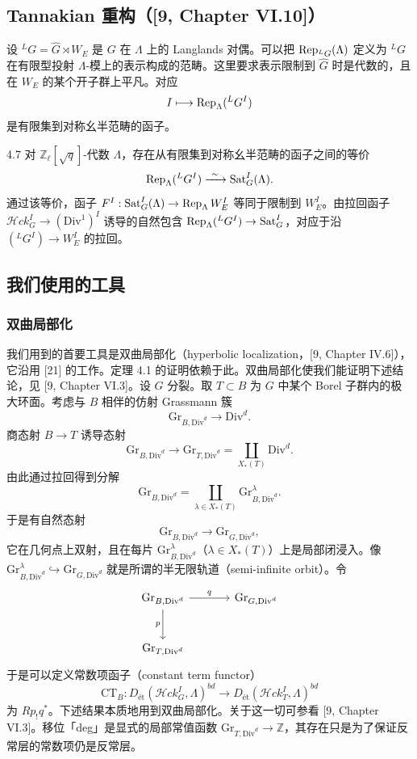 \subsection{Tannakian 重构（[9, Chapter VI.10]）}
设 ${}^{L}G=\widehat{G}\rtimes W_{E}$ 是 $G$ 在 $\Lambda$ 上的 Langlands 对偶。可以把 $\operatorname{Rep}_{{}^{L}G}(\Lambda)$ 定义为 ${}^{L}G$ 在有限型投射 $\Lambda$-模上的表示构成的范畴。这里要求表示限制到 $\widehat{G}$ 时是代数的，且在 $W_{E}$ 的某个开子群上平凡。对应
\[
I\longmapsto\operatorname{Rep}_{\Lambda}({}^{L}G^{I})
\]
是有限集到对称幺半范畴的函子。

\begin{thm}{4.7}
对 $\mathbb{Z}_{\ell}[\sqrt{q}]$-代数 $\Lambda$，存在从有限集到对称幺半范畴的函子之间的等价
\[
\Rep_{\Lambda}({}^{L}G^{I})\xrightarrow{\ \sim\ }\mathrm{Sat}^{I}_{G}(\Lambda).
\]
通过该等价，函子 $F^{I}:\mathrm{Sat}^{I}_{G}(\Lambda)\to\operatorname{Rep}_{\Lambda}W^{I}_{E}$ 等同于限制到 $W^{I}_{E}$。由拉回函子 $\mathcal{H}ck^{I}_{G}\to(\mathrm{Div}^{1})^{I}$ 诱导的自然包含 $\operatorname{Rep}_{\Lambda}({}^{L}G^{I})\to\mathrm{Sat}^{I}_{G}$，对应于沿 $({}^{L}G^{I})\to W^{I}_{E}$ 的拉回。
\label{thm:a3-4-7}
\end{thm}

\subsection{我们使用的工具}
\subsubsection{双曲局部化}
我们用到的首要工具是双曲局部化（hyperbolic localization，[9, Chapter IV.6]），它沿用 [21] 的工作。定理 4.1 的证明依赖于此。双曲局部化使我们能证明下述结论，见 [9, Chapter VI.3]。设 $G$ 分裂。取 $T\subset B$ 为 $G$ 中某个 Borel 子群内的极大环面。考虑与 $B$ 相伴的仿射 Grassmann 簇
\[
\mathrm{Gr}_{B,\mathrm{Div}^{d}}\longrightarrow\mathrm{Div}^{d}.
\]
商态射 $B\to T$ 诱导态射
\[
\mathrm{Gr}_{B,\mathrm{Div}^{d}}\longrightarrow\mathrm{Gr}_{T,\mathrm{Div}^{d}}=\coprod_{X_{*}(T)}\mathrm{Div}^{d}.
\]
由此通过拉回得到分解
\[
\mathrm{Gr}_{B,\mathrm{Div}^{d}}=\coprod_{\lambda\in X_{*}(T)}\mathrm{Gr}^{\lambda}_{B,\mathrm{Div}^{d}}.
\]
于是有自然态射
\[
\mathrm{Gr}_{B,\mathrm{Div}^{d}}\longrightarrow\mathrm{Gr}_{G,\mathrm{Div}^{d}},
\]
它在几何点上双射，且在每片 $\mathrm{Gr}^{\lambda}_{B,\mathrm{Div}^{d}}$（$\lambda\in X_{*}(T)$）上是局部闭浸入。像 $\mathrm{Gr}^{\lambda}_{B,\mathrm{Div}^{d}}\hookrightarrow\mathrm{Gr}_{G,\mathrm{Div}^{d}}$ 就是所谓的半无限轨道（semi-infinite orbit）。令
\[
\begin{tikzcd}[column sep=large,row sep=large]
\mathrm{Gr}_{B,\mathrm{Div}^{d}} \arrow[r, "q"] \arrow[d, "p"'] & \mathrm{Gr}_{G,\mathrm{Div}^{d}} \\
\mathrm{Gr}_{T,\mathrm{Div}^{d}} &
\end{tikzcd}
\]
于是可以定义常数项函子（constant term functor）
\[
\mathrm{CT}_{B}:D_{\mathrm{ét}}(\mathcal{H}ck^{I}_{G},\Lambda)^{bd}\longrightarrow D_{\mathrm{ét}}(\mathcal{H}ck^{I}_{T},\Lambda)^{bd}
\]
为 $Rp_{!}q^{*}$。下述结果本质地用到双曲局部化。关于这一切可参看 [9, Chapter VI.3]。移位「deg」是显式的局部常值函数 $\mathrm{Gr}_{T,\mathrm{Div}^{d}}\to\mathbb{Z}$，其存在只是为了保证反常层的常数项仍是反常层。

